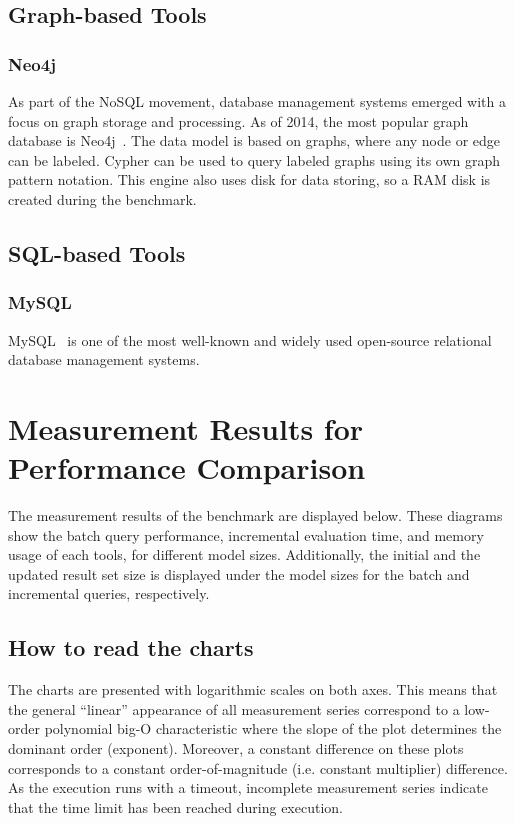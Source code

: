 \subsection{Graph-based Tools}

\subsubsection{Neo4j}
As part of the NoSQL movement, database management systems emerged with a focus on graph storage and processing. As of 2014, the most popular graph database is 
Neo4j~\cite{neo4j}. The data model is based on graphs, where any node or edge can be labeled. Cypher can be used to query labeled graphs using its own graph pattern notation. This engine also uses disk for data storing, so a RAM disk is created during the benchmark.

\subsection{SQL-based Tools}

\subsubsection{MySQL}
MySQL~\cite{mysql} is one of the most well-known and widely used open-source relational database management systems.


\section{Measurement Results for Performance Comparison}
\label{sec:results}

The measurement results of the benchmark are displayed below. These diagrams show the batch query performance, incremental evaluation time, and memory usage of each tools, for different model sizes. Additionally, the initial and the updated result set size is displayed under the model sizes for the batch and incremental queries, respectively.

\subsection{How to read the charts}

The charts are presented with logarithmic scales on both axes. This means that the general ``linear'' appearance of all measurement series correspond to a low-order polynomial big-O characteristic where the slope of the plot determines the dominant order (exponent). Moreover, a constant difference on these plots corresponds to a constant order-of-magnitude (i.e. constant multiplier) difference. As the execution runs with a timeout, incomplete measurement series indicate that the time limit has been reached during execution.
 
